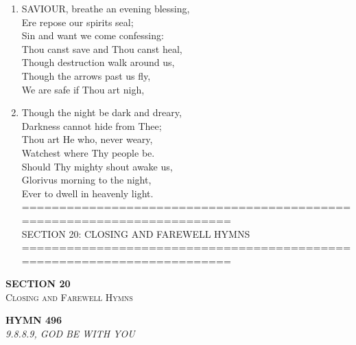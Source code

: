 \documentclass[11pt,a4paper]{article}
\begin{document}
\begin{enumerate}
    \item SAVIOUR, breathe an evening blessing, \\
        Ere repose our spirits seal; \\
        Sin and want we come confessing: \\
        Thou canst save and Thou canst heal, \\
        Though destruction walk around us, \\
        Though the arrows past us fly, \\
        We are safe if Thou art nigh,

    \item Though the night be dark and dreary, \\
        Darkness cannot hide from Thee; \\
        Thou art He who, never weary, \\
        Watchest where Thy people be. \\
        Should Thy mighty shout awake us, \\
        Glorivus morning to the night, \\
        Ever to dwell in heavenly light. \\
        ======================================================================== \\
        SECTION 20: CLOSING AND FAREWELL HYMNS \\
        ========================================================================

\end{enumerate}

\newpage
\thispagestyle{empty}
\vspace*{3.5cm}
\begin{center}
    {\LARGE \textbf{SECTION 20}}\\[0.8em]
    {\Large \textsc{Closing and Farewell Hymns}}
\end{center}
\vspace{3.5cm}

\newpage
\begin{center}
    {\Large \textbf{HYMN 496}}
    \\
    \textit{9.8.8.9, GOD BE WITH YOU}
\end{center}
\vspace{1em}
\end{document}
